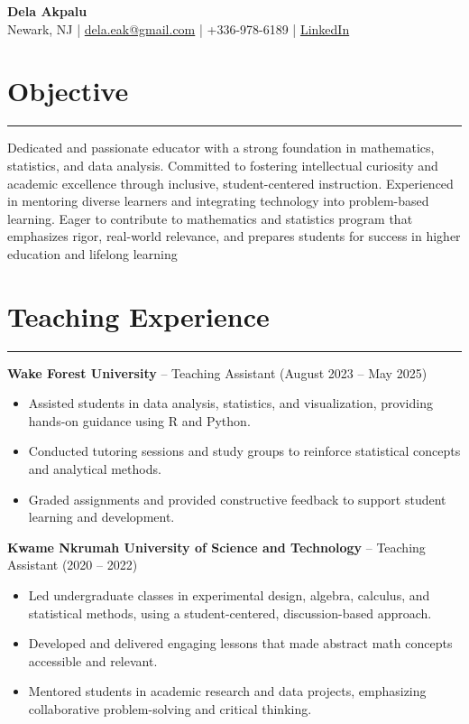 \documentclass[a4paper,11pt]{article}
\begin{document}
\begin{center}
    {\LARGE \textbf{Dela Akpalu}}\\
    Newark, NJ | \href{mailto:dela.eak@gmail.com}{dela.eak@gmail.com} | +336-978-6189 | \href{https://linkedin.com/in/edakpalu}{LinkedIn}
\end{center}

\section*{Objective}
\hrule \vspace{3mm}
Dedicated and passionate educator with a strong foundation in mathematics, statistics, and data analysis. Committed to fostering intellectual curiosity and academic excellence through inclusive, student-centered instruction. Experienced in mentoring diverse learners and integrating technology into problem-based learning. Eager to contribute to mathematics and statistics program that emphasizes rigor, real-world relevance, and prepares students for success in higher education and lifelong learning


\section*{Teaching Experience}
\hrule \vspace{2mm}
\textbf{Wake Forest University} -- Teaching Assistant (August 2023 -- May 2025)
\begin{itemize}
    \item Assisted students in data analysis, statistics, and visualization, providing hands-on guidance using R and Python.
    \item Conducted tutoring sessions and study groups to reinforce statistical concepts and analytical methods.
    \item Graded assignments and provided constructive feedback to support student learning and development.
\end{itemize}

\textbf{Kwame Nkrumah University of Science and Technology} -- Teaching Assistant (2020 -- 2022)
\begin{itemize}
    \item Led undergraduate classes in experimental design, algebra, calculus, and statistical methods, using a student-centered, discussion-based approach.
    \item Developed and delivered engaging lessons that made abstract math concepts accessible and relevant.
    \item Mentored students in academic research and data projects, emphasizing collaborative problem-solving and critical thinking.
\end{itemize}
\end{document}

